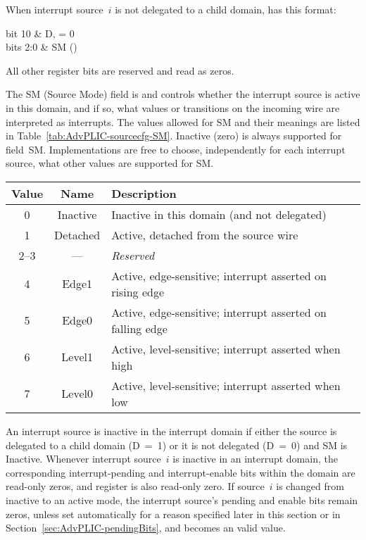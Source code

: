 When interrupt source~$i$ is not delegated to a child domain,
 has this format:\nopagebreak
\begin{displayLinesTable}[l@{\qquad}l]
bit 10   & D, = 0 \\
bits 2:0 & SM (\WARL) \\
\end{displayLinesTable}
All other register bits are reserved and read as zeros.

The SM (Source Mode) field is {\WARL} and controls whether the
interrupt source is active in this domain, and if so, what values or
transitions on the incoming wire are interpreted as interrupts.
The values allowed for SM and their meanings are listed in
Table~\ref{tab:AdvPLIC-sourcecfg-SM}.
Inactive (zero) is always supported for field~SM.
Implementations are free to choose, independently for each interrupt
source, what other values are supported for SM.

\begin{table*}[h!]
\begin{center}
\begin{tabular}{|c|c|l|}
\hline
Value & Name   & Description \\
\hline
\hline
0    & Inactive & Inactive in this domain (and not delegated) \\
1    & Detached & Active, detached from the source wire \\
2--3 & ---      & \emph{Reserved} \\
4    & Edge1    & Active, edge-sensitive; interrupt asserted on rising edge \\
5    & Edge0    & Active, edge-sensitive; interrupt asserted on falling edge \\
6    & Level1   & Active, level-sensitive; interrupt asserted when high \\
7    & Level0   & Active, level-sensitive; interrupt asserted when low \\
\hline
\end{tabular}
\end{center}
\caption{%
Encoding of the SM (Source Mode) field of a  register when
bit~D =~0%
}
\label{tab:AdvPLIC-sourcecfg-SM}
\end{table*}

An interrupt source is inactive in the interrupt domain if either the
source is delegated to a child domain (D~=~1) or it is not delegated
(D~=~0) and SM is Inactive.
Whenever interrupt source~$i$ is inactive in an interrupt domain,
the corresponding interrupt-pending and interrupt-enable bits within
the domain are read-only zeros, and register  is also
read-only zero.
If source~$i$ is changed from inactive to an active mode, the
interrupt source's pending and enable bits remain zeros, unless set
automatically for a reason specified later in this section or in
Section~\ref{sec:AdvPLIC-pendingBits}, and  becomes an
{\unspecified} valid value.

